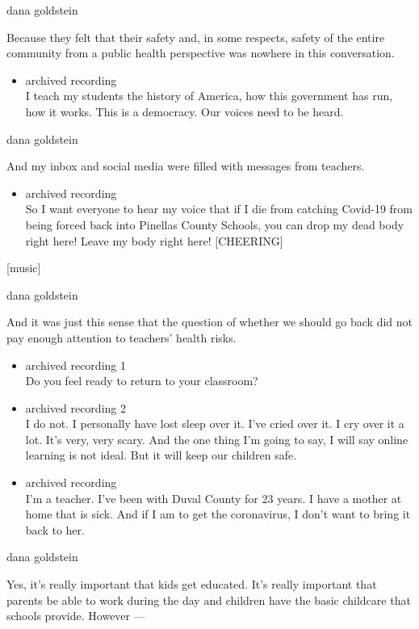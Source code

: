 dana goldstein

Because they felt that their safety and, in some respects, safety of the
entire community from a public health perspective was nowhere in this
conversation.

\begin{itemize}
\tightlist
\item
  archived recording\\
  I teach my students the history of America, how this government has
  run, how it works. This is a democracy. Our voices need to be heard.
\end{itemize}

dana goldstein

And my inbox and social media were filled with messages from teachers.

\begin{itemize}
\tightlist
\item
  archived recording\\
  So I want everyone to hear my voice that if I die from catching
  Covid-19 from being forced back into Pinellas County Schools, you can
  drop my dead body right here! Leave my body right here! {[}CHEERING{]}
\end{itemize}

{[}music{]}

dana goldstein

And it was just this sense that the question of whether we should go
back did not pay enough attention to teachers' health risks.

\begin{itemize}
\item
  archived recording 1\\
  Do you feel ready to return to your classroom?
\item
  archived recording 2\\
  I do not. I personally have lost sleep over it. I've cried over it. I
  cry over it a lot. It's very, very scary. And the one thing I'm going
  to say, I will say online learning is not ideal. But it will keep our
  children safe.
\item
  archived recording\\
  I'm a teacher. I've been with Duval County for 23 years. I have a
  mother at home that is sick. And if I am to get the coronavirus, I
  don't want to bring it back to her.
\end{itemize}

dana goldstein

Yes, it's really important that kids get educated. It's really important
that parents be able to work during the day and children have the basic
childcare that schools provide. However ---

